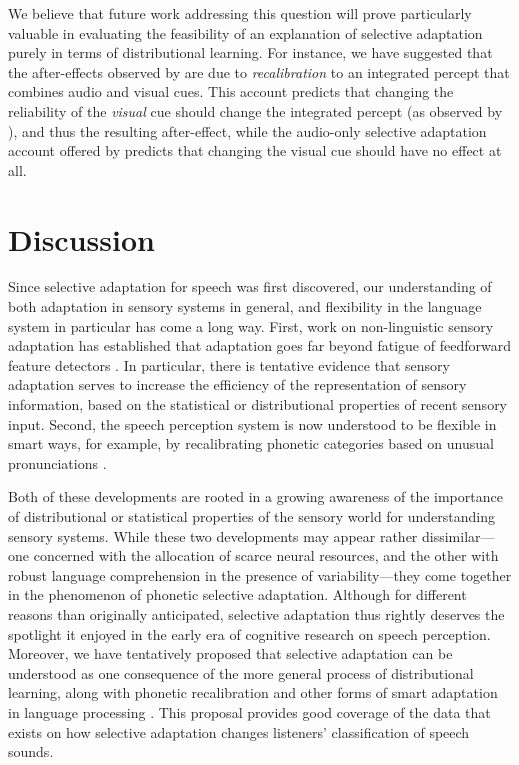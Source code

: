We believe that future work addressing this question will prove particularly valuable in evaluating the feasibility of an explanation of selective adaptation purely in terms of distributional learning. For instance, we have suggested that the after-effects observed by  are due to \emph{recalibration} to an integrated percept that combines audio and visual cues.  This account predicts that changing the reliability of the \emph{visual} cue should change the integrated percept (as observed by ), and thus the resulting after-effect, while the audio-only selective adaptation account offered by  predicts that changing the visual cue should have no effect at all.


\section{Discussion}
\label{sec:discussion}

Since selective adaptation for speech was first discovered, our understanding of both adaptation in sensory systems in general, and flexibility in the language system in particular has come a long way.  First, work on non-linguistic sensory adaptation has established that adaptation goes far beyond fatigue of feedforward feature detectors \cite{Brenner2000,Dragoi2000,Fairhall2001,Gutfreund2012,Kohn2004,Kohn2007,Sharpee2006,Webster2005}.  In particular, there is tentative evidence that sensory adaptation serves to increase the efficiency of the representation of sensory information, based on the statistical or distributional properties of recent sensory input.  Second, the speech perception system is now understood to be flexible in smart ways, for example, by recalibrating phonetic categories based on unusual pronunciations \cite{Bertelson2003,Kraljic2005,Norris2003}.

Both of these developments are rooted in a growing awareness of the importance of distributional or statistical properties of the sensory world for understanding sensory systems.  While these two developments may appear rather dissimilar---one concerned with the allocation of scarce neural resources, and the other with robust language comprehension in the presence of variability---they come together in the phenomenon of phonetic selective adaptation. Although for different reasons than originally anticipated, selective adaptation thus rightly deserves the spotlight it enjoyed in the early era of cognitive research on speech perception.  Moreover, we have tentatively proposed that selective adaptation can be understood as one consequence of the more general process of distributional learning, along with phonetic recalibration and other forms of smart adaptation in language processing \cite{Kleinschmidt2015}.  This proposal provides good coverage of the data that exists on how selective adaptation changes listeners' classification of speech sounds.

